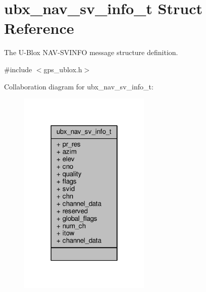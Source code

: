 \hypertarget{structubx__nav__sv__info__t}{\section{ubx\+\_\+nav\+\_\+sv\+\_\+info\+\_\+t Struct Reference}
\label{structubx__nav__sv__info__t}
}


The U-\/\+Blox N\+A\+V-\/\+S\+V\+I\+N\+F\+O message structure definition.  




{\ttfamily \#include $<$gps\+\_\+ublox.\+h$>$}



Collaboration diagram for ubx\+\_\+nav\+\_\+sv\+\_\+info\+\_\+t\+:
\nopagebreak
\begin{figure}[H]
\begin{center}
\leavevmode
\includegraphics[width=178pt]{structubx__nav__sv__info__t__coll__graph}
\end{center}
\end{figure}
